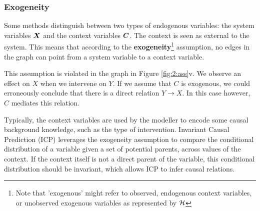 \subsubsection{Exogeneity}

Some methods distinguish between two types of endogenous variables: the system variables $\bm{X}$ and the context variables $\bm{C}$. The context is seen as external to the system. This means that according to the \textbf{exogeneity}\footnote{Note that 'exogenous' might refer to observed, endogenous context variables, or unobserved exogenous variables as represented by $\mathcal{H}$} assumption, no edges in the graph can point from a system variable to a context variable. 

This assumption is violated in the graph in Figure \ref{fig:2:ass}v. We observe an effect on $X$ when we intervene on $Y$. If we assume that $C$ is exogenous, we could erroneously conclude that there is a direct relation $Y\to X$. In this case however, $C$ mediates this relation.

Typically, the context variables are used by the modeller to encode some causal background knowledge, such as the type of intervention. Invariant Causal Prediction (ICP) \citep{peters2016causal} leverages the exogeneity assumption to compare the conditional distribution of a variable given a set of potential parents, across values of the context. If the context itself is not a direct parent of the variable, this conditional distribution should be invariant, which allows ICP to infer causal relations. 


\label{sec:back:meth}